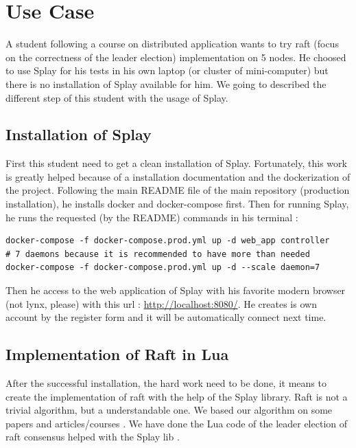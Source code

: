 \documentclass{eplmastersthesis}
\begin{document}
    \chapter{Use Case}

      A student following a course on distributed application wants to try raft (focus on the correctness of the leader election)
      implementation on 5 nodes.
      He choosed to use Splay for his tests in his own laptop (or cluster of mini-computer) but there
      is no installation of Splay available for him.
      We going to described the different step of this student with the usage of Splay.

      \section{Installation of Splay}

        First this student need to get a clean installation of Splay. Fortunately, this work is greatly
        helped because of a installation documentation and the dockerization of the project.
        Following the main README file of the main repository (production installation), he installs docker and
        docker-compose first. Then for running Splay, he runs the requested (by the README) commands in his terminal :
        \begin{lstlisting}[style=MyBash]
docker-compose -f docker-compose.prod.yml up -d web_app controller
# 7 daemons because it is recommended to have more than needed
docker-compose -f docker-compose.prod.yml up -d --scale daemon=7
        \end{lstlisting}
        Then he access to the web application of Splay with his favorite modern browser (not lynx, please) with this url :
        \url{http://localhost:8080/}. He creates is own account by the register form and it will be automatically connect next time.

      \section{Implementation of Raft in Lua}
        After the successful installation, the hard work need to be done, it means to create the implementation of raft
        with the help of the Splay library. Raft is not a trivial algorithm, but a understandable one.
        We based our algorithm on some papers \cite{RaftPaper} and articles/courses \cite{RaftSlide} \cite{RaftSite}.
        We have done the Lua code of the leader election of raft consensus helped with the Splay lib \cite{SplayLib}. \\
\end{document}
